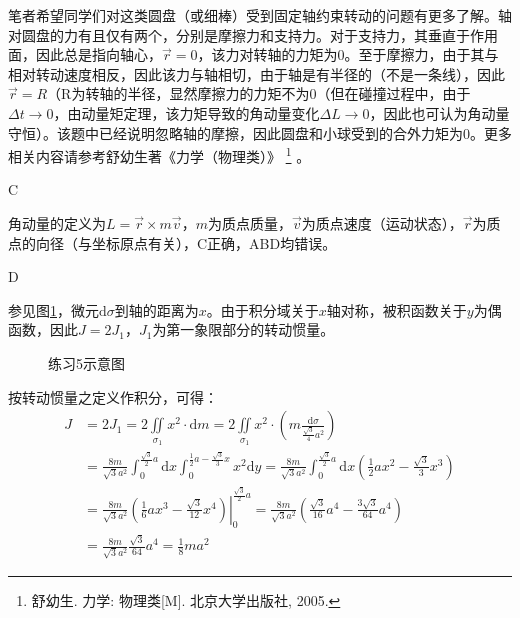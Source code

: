 \documentclass[b5paper,opensource,sourcefont,parskip]{qyxf-book}
\newcommand{\di}[1]{\mathrm{d}#1}
\newcommand{\zbj}[4]
{
	\draw (0,0) node[below left] {$ O $};
	\draw [->] (#1,0) -- (#2,0) node[right] {$ x $};
	\draw [->] (0,#3) -- (0,#4) node[right] {$ y $};
}
\begin{document}
\begin{note}
	笔者希望同学们对这类圆盘（或细棒）受到固定轴约束转动的问题有更多了解。轴对圆盘的力有且仅有两个，分别是摩擦力和支持力。对于支持力，其垂直于作用面，因此总是指向轴心，$ \vec{r}=0 $，该力对转轴的力矩为0。至于摩擦力，由于其与相对转动速度相反，因此该力与轴相切，由于轴是有半径的（不是一条线），因此$ \vec{r}=R $（R为转轴的半径，显然摩擦力的力矩不为0（但在碰撞过程中，由于$ \Delta t\to 0 $，由动量矩定理，该力矩导致的角动量变化$ \Delta L\to 0 $，因此也可认为角动量守恒）。该题中已经说明忽略轴的摩擦，因此圆盘和小球受到的合外力矩为0。更多相关内容请参考舒幼生著《力学（物理类）》
	\footnote{舒幼生. 力学: 物理类[M]. 北京大学出版社, 2005.}
	。
\end{note}

C

\solve 角动量的定义为$ L=\vec{r}\times m\vec{v} $，$ m $为质点质量，$ \vec{v} $为质点速度（运动状态），$ \vec{r} $为质点的向径（与坐标原点有关），C正确，ABD均错误。

D

\solve 参见图\ref{fig:c4-t5}，微元$ \di{\sigma} $到轴的距离为$ x $。由于积分域关于$ x $轴对称，被积函数关于$ y $为偶函数，因此$ J=2J_1 $，$ J_1 $为第一象限部分的转动惯量。

\begin{figure}[htbp]
	\centering		
	\caption{练习5示意图}\label{fig:c4-t5}
\end{figure}

按转动惯量之定义作积分，可得：
\begin{align*}
J&=2J_1=2\iint\limits_{\sigma_1}x^2\cdot\di{m}=2\iint\limits_{\sigma_1}x^2\cdot\left(m\frac{\di{\sigma}}{\frac{\sqrt{3}}{4}a^2}\right)\\
&=\frac{8m}{\sqrt{3}a^2}\int_0^{\frac{\sqrt{3}}{2}a}\di{x}\int_0^{\frac{1}{2}a-\frac{\sqrt{3}}{3}x}x^2\di{y}=\frac{8m}{\sqrt{3}a^2}\int_0^{\frac{\sqrt{3}}{2}a}\di{x}\left(\frac{1}{2}ax^2-\frac{\sqrt{3}}{3}x^3\right)\\
&=\frac{8m}{\sqrt{3}a^2}\left.\left(\frac{1}{6}ax^3-\frac{\sqrt{3}}{12}x^4\right)\right|_0^{\frac{\sqrt{3}}{2}a}=\frac{8m}{\sqrt{3}a^2}\left(\frac{\sqrt{3}}{16}a^4-\frac{3\sqrt{3}}{64}a^4\right)\\
&=\frac{8m}{\sqrt{3}a^2}\frac{\sqrt{3}}{64}a^4=\frac{1}{8}ma^2
\end{align*}
\end{document}
